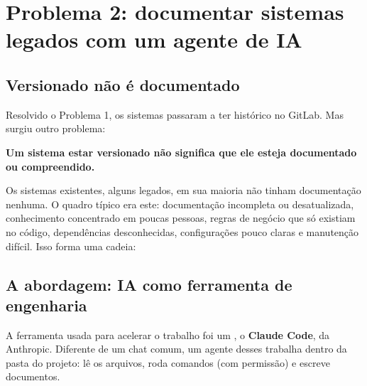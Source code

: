 \chapter{Problema 2: documentar sistemas legados com um agente de IA}
\label{cap:problema2}

\section{Versionado não é documentado}

Resolvido o Problema 1, os sistemas passaram a ter histórico no GitLab. Mas surgiu outro problema:

\begin{conceito}
\textbf{Um sistema estar versionado não significa que ele esteja documentado ou compreendido.}
\end{conceito}

Os sistemas existentes, alguns legados, em sua maioria não tinham documentação nenhuma. O quadro típico era este: documentação incompleta ou desatualizada, conhecimento concentrado em poucas pessoas, regras de negócio que só existiam no código, dependências desconhecidas, configurações pouco claras e manutenção difícil. Isso forma uma cadeia:

\begin{center}
\end{center}

\section{A abordagem: IA como ferramenta de engenharia}

A ferramenta usada para acelerar o trabalho foi um , o \textbf{Claude Code}, da Anthropic. Diferente de um chat comum, um agente desses trabalha dentro da pasta do projeto: lê os arquivos, roda comandos (com permissão) e escreve documentos.

